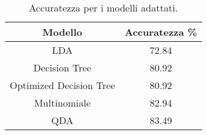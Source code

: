 \begin{table}[H]
\centering
\caption{Accuratezza per i modelli adattati.}
\begin{tabular}{cc}
\toprule
                 Modello &  Accuratezza \% \\
\midrule
                     LDA &          72.84 \\
           Decision Tree &          80.92 \\
 Optimized Decision Tree &          80.92 \\
            Multinomiale &          82.94 \\
                     QDA &          83.49 \\
\bottomrule
\end{tabular}
\label{tab:acc}
\end{table}